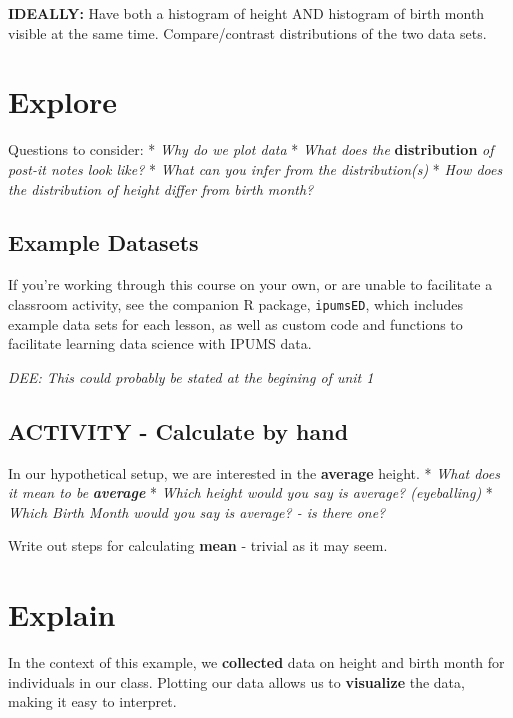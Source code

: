 \documentclass[
]{book}
\begin{document}
\textbf{IDEALLY:} Have both a histogram of height AND histogram of birth month visible
at the same time. Compare/contrast distributions of the two data sets.

\hypertarget{explore}{%
\section{Explore}\label{explore}}

Questions to consider:
* \emph{Why do we plot data}
* \emph{What does the} \textbf{distribution} \emph{of post-it notes look like?}
* \emph{What can you infer from the distribution(s)}
* \emph{How does the distribution of height differ from birth month?}

\hypertarget{example-datasets}{%
\subsection{Example Datasets}\label{example-datasets}}

If you're working through this course on your own, or are unable to facilitate a classroom activity, see the companion R package, \texttt{ipumsED}, which includes example data sets for each lesson, as well as custom code and functions to facilitate learning data science with IPUMS data.

\emph{DEE: This could probably be stated at the begining of unit 1}

\hypertarget{activity---calculate-by-hand}{%
\subsection{ACTIVITY - Calculate by hand}\label{activity---calculate-by-hand}}

In our hypothetical setup, we are interested in the \textbf{average} height.
* \emph{What does it mean to be} \textbf{\emph{average}}
* \emph{Which height would you say is average? (eyeballing)}
* \emph{Which Birth Month would you say is average? - is there one?}

Write out steps for calculating \textbf{mean} - trivial as it may seem.

\hypertarget{explain}{%
\section{Explain}\label{explain}}

In the context of this example, we \textbf{collected} data on height and birth month for individuals in our class.
Plotting our data allows us to \textbf{visualize} the data, making it easy to interpret.
\end{document}
